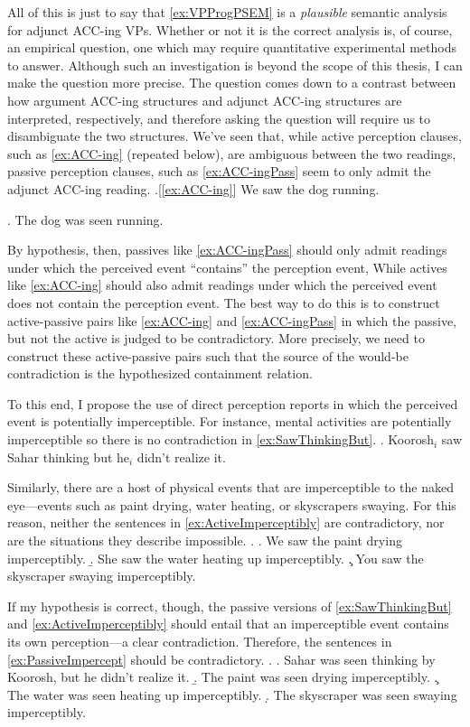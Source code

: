 All of this is just to say that \cref{ex:VPProgPSEM} is a \textit{plausible} semantic analysis for adjunct ACC-ing VPs.
Whether or not it is the correct analysis is, of course, an empirical question, one which may require quantitative experimental methods to answer.
Although such an investigation is beyond the scope of this thesis, I can make the question more precise.
The question comes down to a contrast between how argument ACC-ing structures and adjunct ACC-ing structures are interpreted, respectively, and therefore asking the question will require us to disambiguate the two structures.
We've seen that, while active perception clauses, such as \cref{ex:ACC-ing} (repeated below), are ambiguous between the two readings, passive perception clauses, such as \cref{ex:ACC-ingPass} seem to only admit the adjunct ACC-ing reading.
\ex.[\cref{ex:ACC-ing}] We saw the dog running.

\ex.\label{ex:ACC-ingPass} The dog was seen running.

By hypothesis, then, passives like \cref{ex:ACC-ingPass} should only admit readings under which the perceived event ``contains'' the perception event, While actives like \cref{ex:ACC-ing} should also admit readings under which the perceived event does not contain the perception event.
The best way to do this is to construct active-passive pairs like \cref{ex:ACC-ing} and \cref{ex:ACC-ingPass} in which the passive, but not the active is judged to be contradictory.
More precisely, we need to construct these active-passive pairs such that the source of the would-be contradiction is the hypothesized containment relation.

To this end, I propose the use of direct perception reports in which the perceived event is potentially imperceptible.
For instance, mental activities are potentially imperceptible so there is no contradiction in \cref{ex:SawThinkingBut}.
\ex.\label{ex:SawThinkingBut} Koorosh$_{i}$ saw Sahar thinking but he$_{i}$ didn't realize it.

Similarly, there are a host of physical events that are imperceptible to the naked eye---events such as paint drying, water heating, or skyscrapers swaying.
For this reason, neither the sentences in \cref{ex:ActiveImperceptibly} are contradictory, nor are the situations they describe impossible.
\ex.\label{ex:ActiveImperceptibly}
\a. We saw the paint drying imperceptibly.
\b. She saw the water heating up imperceptibly.
\c. You saw the skyscraper swaying imperceptibly.

If my hypothesis is correct, though, the passive versions of \cref{ex:SawThinkingBut} and \cref{ex:ActiveImperceptibly} should entail that an imperceptible event contains its own perception---a clear contradiction.
Therefore, the sentences in \cref{ex:PassiveImpercept} should be contradictory.
\ex.\label{ex:PassiveImpercept} 
\a. Sahar was seen thinking by Koorosh, but he didn't realize it.
\b. The paint was seen drying imperceptibly.
\c. The water was seen heating up imperceptibly.
\d. The skyscraper was seen swaying imperceptibly.

